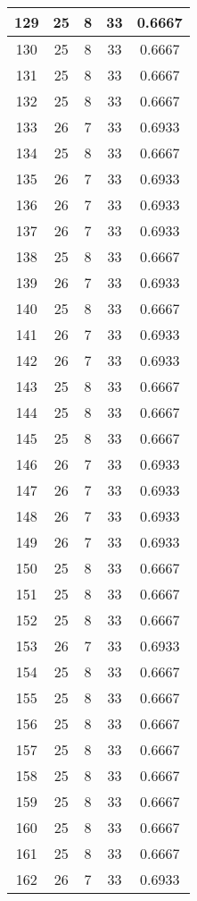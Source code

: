 \documentclass[letterpaper, 12pt]{article}
\begin{document}
\begin{longtable}{|c|c|c|c|c|}
\hline
129 & 25 & 8 & 33 & 0.6667 \\
\hline
130 & 25 & 8 & 33 & 0.6667 \\
\hline
131 & 25 & 8 & 33 & 0.6667 \\
\hline
132 & 25 & 8 & 33 & 0.6667 \\
\hline
133 & 26 & 7 & 33 & 0.6933 \\
\hline
134 & 25 & 8 & 33 & 0.6667 \\
\hline
135 & 26 & 7 & 33 & 0.6933 \\
\hline
136 & 26 & 7 & 33 & 0.6933 \\
\hline
137 & 26 & 7 & 33 & 0.6933 \\
\hline
138 & 25 & 8 & 33 & 0.6667 \\
\hline
139 & 26 & 7 & 33 & 0.6933 \\
\hline
140 & 25 & 8 & 33 & 0.6667 \\
\hline
141 & 26 & 7 & 33 & 0.6933 \\
\hline
142 & 26 & 7 & 33 & 0.6933 \\
\hline
143 & 25 & 8 & 33 & 0.6667 \\
\hline
144 & 25 & 8 & 33 & 0.6667 \\
\hline
145 & 25 & 8 & 33 & 0.6667 \\
\hline
146 & 26 & 7 & 33 & 0.6933 \\
\hline
147 & 26 & 7 & 33 & 0.6933 \\
\hline
148 & 26 & 7 & 33 & 0.6933 \\
\hline
149 & 26 & 7 & 33 & 0.6933 \\
\hline
150 & 25 & 8 & 33 & 0.6667 \\
\hline
151 & 25 & 8 & 33 & 0.6667 \\
\hline
152 & 25 & 8 & 33 & 0.6667 \\
\hline
153 & 26 & 7 & 33 & 0.6933 \\
\hline
154 & 25 & 8 & 33 & 0.6667 \\
\hline
155 & 25 & 8 & 33 & 0.6667 \\
\hline
156 & 25 & 8 & 33 & 0.6667 \\
\hline
157 & 25 & 8 & 33 & 0.6667 \\
\hline
158 & 25 & 8 & 33 & 0.6667 \\
\hline
159 & 25 & 8 & 33 & 0.6667 \\
\hline
160 & 25 & 8 & 33 & 0.6667 \\
\hline
161 & 25 & 8 & 33 & 0.6667 \\
\hline
162 & 26 & 7 & 33 & 0.6933 \\

\end{longtable}
\end{document}
